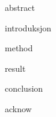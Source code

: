 \documentclass [12pt]{article}
\begin{document}
\maketitle
\newpage
 {abstract}

 {introduksjon}

 {method}

 {result}

 {conclusion}

 {acknow}



\end{document}
